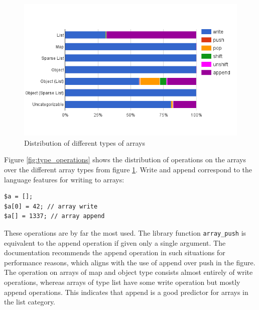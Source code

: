 \begin{figure}[htbp]
\centering
\includegraphics[width=\textwidth]{chapters/study/g12.png}
\caption{Distribution of different types of arrays}
\label{fig:array_types}
\end{figure}

Figure \ref{fig:type_operations} shows the distribution of operations on the arrays over the different array types from figure \ref{fig:array_types}. Write and append correspond to the language features for writing to arrays:

\begin{lstlisting}
$a = [];
$a[0] = 42; // array write
$a[] = 1337; // array append
\end{lstlisting}
These operations are by far the most used. The library function \texttt{array\_push} is equivalent to the append operation if given only a single argument. The documentation recommends the append operation in such situations for performance reasons, which aligns with the use of append over push in the figure. The operation on arrays of map and object type consists almost entirely of write operations, whereas arrays of type list have some write operation but mostly append operations. This indicates that append is a good predictor for arrays in the list category.

